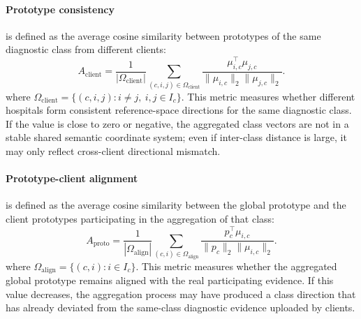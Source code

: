 \documentclass[letterpaper]{article}
\begin{document}
\paragraph{Prototype consistency}
is defined as the average cosine similarity between prototypes of the same diagnostic class from different clients:
\begin{equation}
A_{\mathrm{client}}
=\frac{1}{|\Omega_{\mathrm{client}}|}
\sum_{(c,i,j)\in\Omega_{\mathrm{client}}}
\frac{\mu_{i,c}^\top\mu_{j,c}}
{\|\mu_{i,c}\|_2\|\mu_{j,c}\|_2}.
\end{equation}
where $\Omega_{\mathrm{client}}=\{(c,i,j):i\ne j,\ i,j\in I_c\}$. This metric measures whether different hospitals form consistent reference-space directions for the same diagnostic class. If the value is close to zero or negative, the aggregated class vectors are not in a stable shared semantic coordinate system; even if inter-class distance is large, it may only reflect cross-client directional mismatch.

\paragraph{Prototype-client alignment}
is defined as the average cosine similarity between the global prototype and the client prototypes participating in the aggregation of that class:
\begin{equation}
A_{\mathrm{proto}}
=\frac{1}{|\Omega_{\mathrm{align}}|}
\sum_{(c,i)\in\Omega_{\mathrm{align}}}
\frac{p_c^\top\mu_{i,c}}
{\|p_c\|_2\|\mu_{i,c}\|_2}.
\end{equation}
where $\Omega_{\mathrm{align}}=\{(c,i):i\in I_c\}$. This metric measures whether the aggregated global prototype remains aligned with the real participating evidence. If this value decreases, the aggregation process may have produced a class direction that has already deviated from the same-class diagnostic evidence uploaded by clients.
\end{document}
